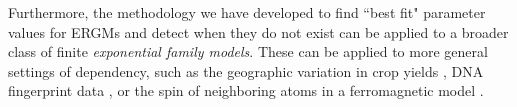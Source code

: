 \documentclass[12pt]{article}
\begin{document}
Furthermore, the methodology we have developed to find ``best fit" parameter 
values for ERGMs and detect when they do not exist can be applied to a 
broader class of finite \emph{exponential family models}.  These
can be applied to more general settings of dependency, such as the geographic 
variation in crop yields \citep{Besag:1974,Besag:1975},
DNA fingerprint data \citep{Geyer:1992}, or the spin of neighboring 
atoms in a ferromagnetic model \citep{Ising,Potts}.


\newpage




%

%


%

% 
\end{document}
